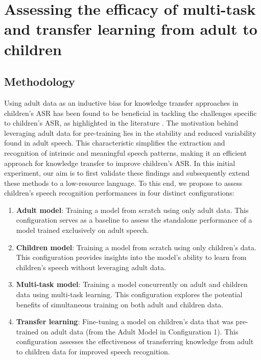 \section{Assessing the efficacy of multi-task and transfer learning from adult to children}
\label{section:HMMDNNADULT2CHILD}
\subsection{Methodology}

Using adult data as an inductive bias for knowledge transfer approaches in children's ASR has been found to be beneficial in tackling the challenges specific to children's ASR, as highlighted in the literature \cite{TFchildren,TransferLF,2019multi}. The motivation behind leveraging adult data for pre-training lies in the stability and reduced variability found in adult speech. This characteristic simplifies the extraction and recognition of intrinsic and meaningful speech patterns, making it an efficient approach for knowledge transfer to improve children's \ac{ASR}. In this initial experiment, our aim is to first validate these findings and subsequently extend these methods to a low-resource language. To this end, we propose to assess children's speech recognition performances in four distinct configurations:



\begin{enumerate}
    \item \textbf{Adult model}: Training a model from scratch using only adult data. This configuration serves as a baseline to assess the standalone performance of a model trained exclusively on adult speech.
    \item \textbf{Children model}: Training a model from scratch using only children's data. This configuration provides insights into the model's ability to learn from children's speech without leveraging adult data.
    \item \textbf{Multi-task model}: Training a model concurrently on adult and children data using multi-task learning. This configuration explores the potential benefits of simultaneous training on both adult and children data.
    \item \textbf{Transfer learning}: Fine-tuning a model on children's data that was pre-trained on adult data (from the Adult Model in Configuration 1). This configuration assesses the effectiveness of transferring knowledge from adult to children data for improved speech recognition.
\end{enumerate}

